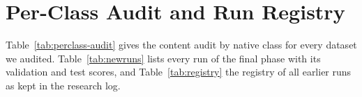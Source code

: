 \section{Per-Class Audit and Run Registry}
\label{app:registry}
Table~\ref{tab:perclass-audit} gives the content audit by native class for every dataset we audited. Table~\ref{tab:newruns} lists every run of the final phase with its validation and test scores, and Table~\ref{tab:registry} the registry of all earlier runs as kept in the research log.



